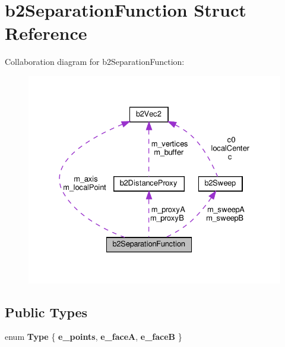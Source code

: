 \hypertarget{structb2SeparationFunction}{}\section{b2\+Separation\+Function Struct Reference}
\label{structb2SeparationFunction}


Collaboration diagram for b2\+Separation\+Function\+:
\nopagebreak
\begin{figure}[H]
\begin{center}
\leavevmode
\includegraphics[width=328pt]{structb2SeparationFunction__coll__graph}
\end{center}
\end{figure}
\subsection*{Public Types}
\begin{DoxyCompactItemize}
\item 
\mbox{\label{structb2SeparationFunction_a8c1446894223e9b6c80dc4d7230141a4}} 
enum {\bfseries Type} \{ {\bfseries e\+\_\+points}, 
{\bfseries e\+\_\+faceA}, 
{\bfseries e\+\_\+faceB}
 \}
\end{DoxyCompactItemize}
